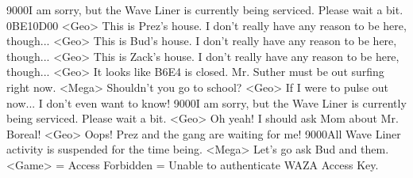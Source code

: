 {90}{00}I am sorry, but the Wave Liner is currently being serviced. Please wait a bit. 
{0B}{E1}{0D}{00}
<Geo> This is Prez's house. I don't really have any reason to be here, though... 
<Geo> This is Bud's house. I don't really have any reason to be here, though... 
<Geo> This is Zack's house. I don't really have any reason to be here, though... 
<Geo> It looks like {B6}{E4} is closed. 
Mr. Suther must be out surfing right now. 
<Mega> Shouldn't you go to school? 
<Geo> If I were to pulse out now... I don't even want to know! 
{90}{00}I am sorry, but the Wave Liner is currently being serviced. Please wait a bit. 
<Geo> Oh yeah! I should ask Mom about Mr. Boreal! 
<Geo> Oops! Prez and the gang are waiting for me! 
{90}{00}All Wave Liner activity is suspended for the time being. 
<Mega> Let's go ask Bud and them. 
<Game> = Access Forbidden = Unable to authenticate WAZA Access Key. 
